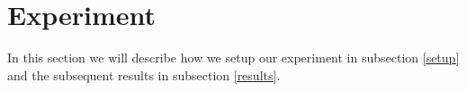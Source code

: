 \section{Experiment}\label{Experiment}
In this section we will describe how we setup our experiment in subsection \ref{setup} and the subsequent results in subsection \ref{results}.


